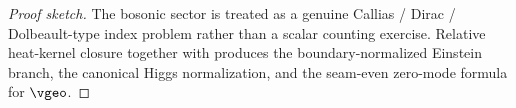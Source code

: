 \begin{proof}[Proof sketch]
The bosonic sector is treated as a genuine Callias / Dirac / Dolbeault-type index problem rather
than a scalar counting exercise. Relative heat-kernel closure together with
produces the boundary-normalized Einstein branch, the canonical Higgs normalization, and the
seam-even zero-mode formula for $\vgeo$.
\end{proof}
